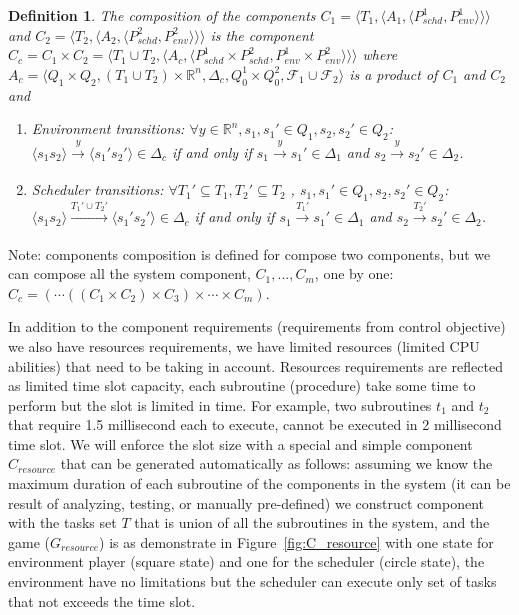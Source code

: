 \documentclass[ twoside, 12pt ]{article}
\newcommand\R{{\mathbb R}}
\newtheorem{dfn}{Definition} %
\begin{document}
\begin{dfn}
    The composition of the components $C_1=\langle T_1, \langle A_1, \langle P_{schd}^1, P_{env}^1\rangle\rangle\rangle$ and $C_2=\langle T_2, \langle A_2, \langle P_{schd}^2, P_{env}^2\rangle\rangle\rangle$ is the component $C_c = C_1 \times C_2 = \langle T_1 \cup T_2, \langle A_c, \langle P_{schd}^1 \times P_{schd}^2, P_{env}^1 \times P_{env}^2 \rangle\rangle\rangle$ where $A_c= \langle Q_1 \times Q_2,(T_1 \cup T_2) \times \R^n,\Delta_c,Q_0^1 \times Q_0^2,\mathcal{F}_1 \cup \mathcal{F}_2 \rangle$ is a product of $C_1$ and $C_2$ and 
    \begin{enumerate}
        \item Environment transitions: $\forall y \in \R^n, s_1 , s_1' \in Q_1, s_2 , s_2' \in Q_2$:
        $\langle s_{1} s_2 \rangle \xrightarrow[]{y} \langle s_{1}' s_2' \rangle \in \Delta_c$
        if and only if 
        $s_{1} \xrightarrow[]{y} s_{1}' \in \Delta_1$ and $s_{2} \xrightarrow[]{y} s_{2}' \in \Delta_2$.
        \item Scheduler transitions: $\forall T_1' \subseteq T_1,T_2' \subseteq T_2$ , $s_1 , s_1' \in Q_1, s_2 , s_2' \in Q_2$:
        $\langle s_{1} s_2 \rangle \xrightarrow[]{T_1' \cup T_2'} \langle s_{1}' s_2' \rangle \in \Delta_c$
        if and only if         
        $s_{1} \xrightarrow[]{T_1'} s_{1}' \in \Delta_1$ and $s_{2} \xrightarrow[]{T_2'} s_{2}' \in \Delta_2$.
    \end{enumerate}
\end{dfn}

Note: components composition is defined for compose two components, but we can compose all the system component, $C_1 , ... , C_m$, one by one: $C_c = (\cdots((C_1 \times C_2) \times C_3 ) \times \cdots \times C_m)$.

In addition to the component requirements (requirements from control objective) we also have resources requirements, we have limited resources (limited CPU abilities) that need to be taking in account.
Resources requirements are reflected as limited time slot capacity, each subroutine (procedure) take some time to perform but the slot is limited in time.
For example, two subroutines $t_1$ and $t_2$ that require 1.5 millisecond each to execute, cannot be executed in 2 millisecond time slot.
We will enforce the slot size with a special and simple component $C_{resource}$ that can be generated automatically as follows:
assuming we know the maximum duration of each subroutine of the components in the system (it can be result of analyzing, testing, or manually pre-defined) we construct component with the tasks set $T$ that is union of all the subroutines in the system, and the game ($G_{resource}$) is as demonstrate in Figure~\ref{fig:C_resource} with one state for environment player (square state) and one for the scheduler (circle state), the environment have no limitations but the scheduler can execute only set of tasks that not exceeds the time slot.
\end{document}

